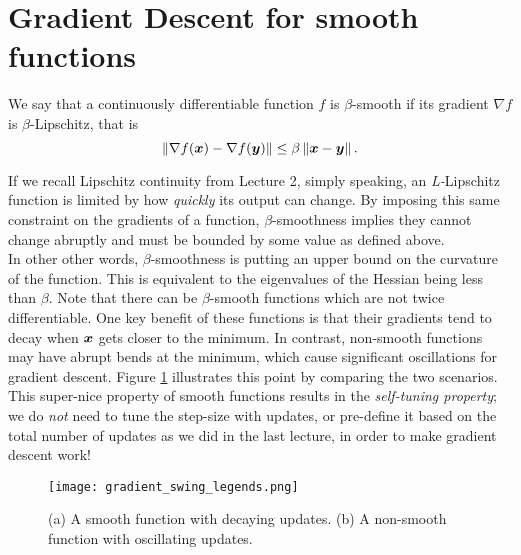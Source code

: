 \documentclass{article}
\begin{document}
\section{Gradient Descent for smooth functions}
\label{sec:gradient}
\begin{defn}
We say that a continuously differentiable function $f$ is $\beta$-smooth if its gradient $\nabla f$ is $\beta$-Lipschitz, that is 
\[
	\left\|\nabla f({\bm{x}}) - \nabla f({\bm{y}})\right\| \leq \beta \left\|{\bm{x}}-{\bm{y}}\right\|.
\]
\end{defn}
If we recall Lipschitz continuity from Lecture 2, simply speaking, an \textit{L-}Lipschitz function is limited by how \textit{quickly} its output can change. By imposing this same constraint on the gradients of a function, $\beta$-smoothness implies they cannot change abruptly and must be bounded by some value as defined above.
\\


In other other words, $\beta$-smoothness is putting an upper bound on the curvature of the function. 
This is equivalent to the eigenvalues of the Hessian being less than $\beta$. 
Note that there can be $\beta$-smooth functions which are not twice differentiable. 
One key benefit of these functions is that their gradients tend to decay when ${\bm{x}}$ gets closer to the minimum. 
In contrast, non-smooth functions may have abrupt bends at the minimum, which cause significant oscillations for gradient descent. Figure \ref{fig:gradient_updates} illustrates this point by comparing the two scenarios.
This super-nice property of smooth functions results in the \emph{self-tuning property}; we do \emph{not} need to tune the step-size with updates, or pre-define it based on the total number of updates as we did in the last lecture, in order to make gradient descent work! 

\begin{figure}[ht]
\centering
    \texttt{[image: gradient\_swing\_legends.png]}%
    \caption{(a) A smooth function with decaying updates. (b) A non-smooth function with oscillating updates.}
    \label{fig:gradient_updates}
\end{figure}
\end{document}
